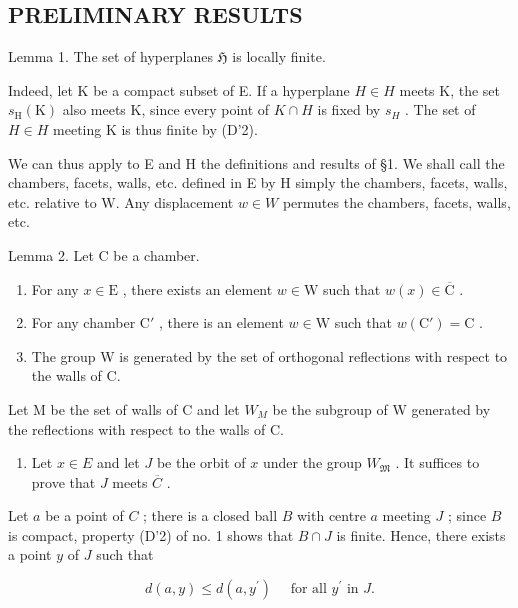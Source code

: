 \subsection{PRELIMINARY RESULTS}

Lemma 1. The set of hyperplanes \(\mathfrak{H}\) is locally finite.

Indeed, let K be a compact subset of E. If a hyperplane \(H \in H\) meets K, the set \(s_{\mathrm{H}}(\mathrm{K})\) also meets K, since every point of \(K \cap H\) is fixed by \(s_{H}\) . The set of \(H \in H\) meeting K is thus finite by (D'2).

We can thus apply to E and H the definitions and results of §1. We shall call the chambers, facets, walls, etc. defined in E by H simply the chambers, facets, walls, etc. relative to W. Any displacement \(w \in W\) permutes the chambers, facets, walls, etc.

Lemma 2. Let C be a chamber.

\begin{enumerate}
\def\labelenumi{(\roman{enumi})}
\item
  For any \(x \in \mathrm{E}\) , there exists an element \(w \in \mathrm{W}\) such that \(w(x) \in \overline{\mathrm{C}}\) .
\item
  For any chamber \(\mathrm{C}'\) , there is an element \(w \in \mathrm{W}\) such that \(w(\mathrm{C}') = \mathrm{C}\) .
\item
  The group W is generated by the set of orthogonal reflections with respect to the walls of C.
\end{enumerate}

Let M be the set of walls of C and let \(W_{M}\) be the subgroup of W generated by the reflections with respect to the walls of C.

\begin{enumerate}
\def\labelenumi{(\roman{enumi})}
\tightlist
\item
  Let \(x \in E\) and let \(J\) be the orbit of \(x\) under the group \(W_{\mathfrak{M}}\) . It suffices to prove that \(J\) meets \(\overline{C}\) .
\end{enumerate}

Let \(a\) be a point of \(C\) ; there is a closed ball \(B\) with centre \(a\) meeting \(J\) ; since \(B\) is compact, property (D'2) of no. 1 shows that \(B \cap J\) is finite. Hence, there exists a point \(y\) of \(J\) such that

\[
d (a, y) \leqslant d (a, y ^ {\prime}) \quad \text { for   all } y ^ {\prime} \text { in } J.\tag{1}
\]

